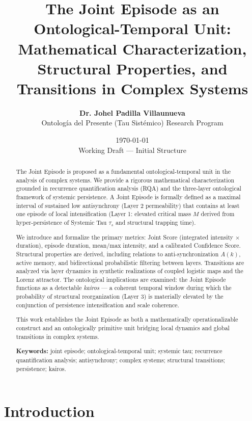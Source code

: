 \documentclass[11pt,a4paper]{article}
\title{\textbf{The Joint Episode as an Ontological-Temporal Unit:}\\[0.25em]
\large Mathematical Characterization, Structural Properties, and Transitions in Complex Systems}
\author{
    \textbf{Dr. Johel Padilla Villaunueva}\\[0.2em]
    \small Ontología del Presente (Tau Sistémico) Research Program
}
\date{\today \\ \small Working Draft — Initial Structure}
\begin{document}
\maketitle

\begin{abstract}
\noindent
The Joint Episode is proposed as a fundamental ontological-temporal unit in the analysis of complex systems. We provide a rigorous mathematical characterization grounded in recurrence quantification analysis (RQA) and the three-layer ontological framework of systemic persistence. A Joint Episode is formally defined as a maximal interval of sustained low antisynchrony (Layer 2 permeability) that contains at least one episode of local intensification (Layer 1: elevated critical mass $M$ derived from hyper-persistence of Systemic Tau $\tau_s$ and structural trapping time). 

We introduce and formalize the primary metrics: Joint Score (integrated intensity $\times$ duration), episode duration, mean/max intensity, and a calibrated Confidence Score. Structural properties are derived, including relations to anti-synchronization $A(k)$, active memory, and bidirectional probabilistic filtering between layers. Transitions are analyzed via layer dynamics in synthetic realizations of coupled logistic maps and the Lorenz attractor. The ontological implications are examined: the Joint Episode functions as a detectable \textit{kairos} — a coherent temporal window during which the probability of structural reorganization (Layer 3) is materially elevated by the conjunction of persistence intensification and scale coherence. 

This work establishes the Joint Episode as both a mathematically operationalizable construct and an ontologically primitive unit bridging local dynamics and global transitions in complex systems.

\vspace{0.15em}
\noindent\textbf{Keywords:} joint episode; ontological-temporal unit; systemic tau; recurrence quantification analysis; antisynchrony; complex systems; structural transitions; persistence; kairos.
\end{abstract}

\vspace{0.5em}

\section{Introduction}
\end{document}
